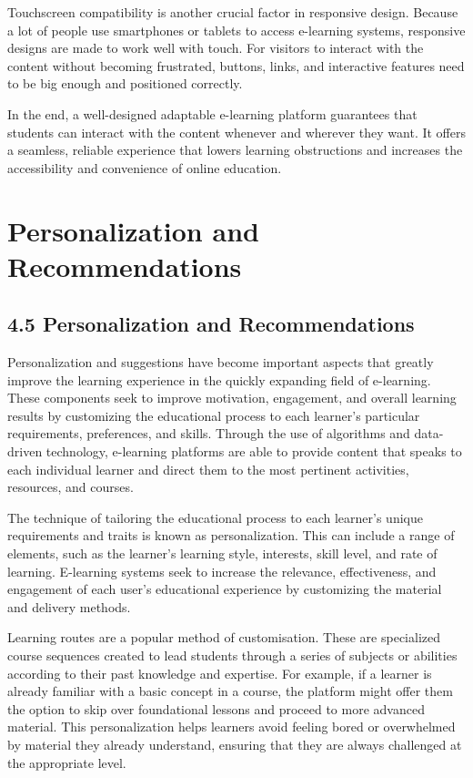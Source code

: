 \documentclass[BTech]{audiss}
\begin{document}
Touchscreen compatibility is another crucial factor in responsive design. Because a lot of people use smartphones or tablets to access e-learning systems, responsive designs are made to work well with touch. For visitors to interact with the content without becoming frustrated, buttons, links, and interactive features need to be big enough and positioned correctly.

In the end, a well-designed adaptable e-learning platform guarantees that students can interact with the content whenever and wherever they want. It offers a seamless, reliable experience that lowers learning obstructions and increases the accessibility and convenience of online education.
\newpage
\section{Personalization and Recommendations}
\subsection{4.5 Personalization and Recommendations}
Personalization and suggestions have become important aspects that greatly improve the learning experience in the quickly expanding field of e-learning. These components seek to improve motivation, engagement, and overall learning results by customizing the educational process to each learner's particular requirements, preferences, and skills. Through the use of algorithms and data-driven technology, e-learning platforms are able to provide content that speaks to each individual learner and direct them to the most pertinent activities, resources, and courses.

The technique of tailoring the educational process to each learner's unique requirements and traits is known as personalization. This can include a range of elements, such as the learner's learning style, interests, skill level, and rate of learning. E-learning systems seek to increase the relevance, effectiveness, and engagement of each user's educational experience by customizing the material and delivery methods.

Learning routes are a popular method of customisation. These are specialized course sequences created to lead students through a series of subjects or abilities according to their past knowledge and expertise. For example, if a learner is already familiar with a basic concept in a course, the platform might offer them the option to skip over foundational lessons and proceed to more advanced material. This personalization helps learners avoid feeling bored or overwhelmed by material they already understand, ensuring that they are always challenged at the appropriate level.
\newpage
\end{document}

